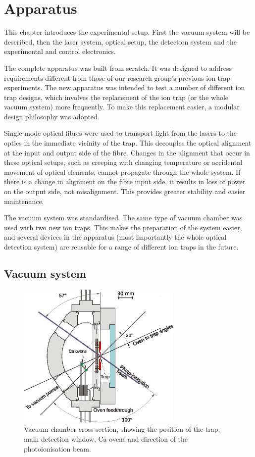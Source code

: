 \setcounter{chapter}{3} %
\chapter{Apparatus}
\label{chapter:apparatus}

This chapter introduces the experimental setup. First the vacuum system will be described, then the laser system, optical setup, the detection system and the experimental and control electronics.

The complete apparatus was built from scratch. It was designed to address requirements different from those of our research group's previous ion trap experiments. The new apparatus was intended to test a number of different ion trap designs, which involves the replacement of the ion trap (or the whole vacuum system) more frequently. To make this replacement easier, a modular design philosophy was adopted.

Single-mode optical fibres were used to transport light from the lasers to the optics in the immediate vicinity of the trap. This decouples the optical alignment at the input and output side of the fibre. Changes in the alignment that occur in these optical setups, such as creeping with changing temperature or accidental movement of optical elements, cannot propagate through the whole system. If there is a change in alignment on the fibre input side, it results in loss of power on the output side, not misalignment. This provides greater stability and easier maintenance. 

The vacuum system was standardised. The same type of vacuum chamber was used with two new ion traps. This makes the preparation of the system easier, and several devices in the apparatus (most importantly the whole optical detection system) are reusable for a range of different ion traps in the future.


\section{Vacuum system}

\begin{figure}[t]
\centering
\includegraphics[width=8cm]{chapter4/vacuum/vacuum_chamber_scheme4}
\caption[Vacuum chamber schematics]{Vacuum chamber cross section, showing the position of the trap, main detection window, Ca ovens and direction of the photoionisation beam. \cversion}
\label{fig:vacuum}
\end{figure} 

